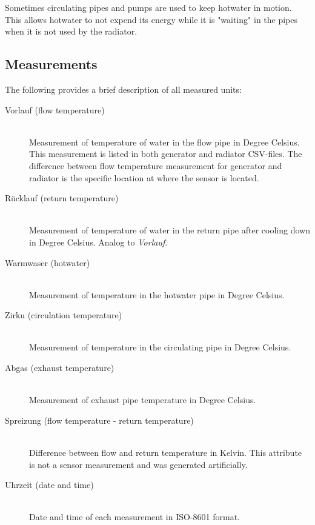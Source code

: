 \documentclass[bachelor,english]{info1thesis}
\begin{document}
Sometimes circulating pipes and pumps are used to keep hotwater in motion. This allows hotwater to not expend its energy while it is "waiting" in the pipes when it is not used by the radiator.

\subsection{Measurements}
\label{sec:measurements}

The following provides a brief description of all measured units:

\begin{description}
	\item[Vorlauf (flow temperature)]\hfill \\
	Measurement of temperature of water in the flow pipe in Degree Celsius. This measurement is listed in both generator and radiator CSV-files. The difference between flow temperature measurement for generator and radiator is the specific location at where the sensor is located.
	\item[Rücklauf (return temperature)]\hfill \\ 
	Measurement of temperature of water in the return pipe after cooling down in Degree Celsius. Analog to \textit{Vorlauf}.
	\item[Warmwaser (hotwater)]\hfill \\ 
	Measurement of temperature in the hotwater pipe in Degree Celsius.
	\item[Zirku (circulation temperature)]\hfill \\ 
	Measurement of temperature in the circulating pipe in Degree Celsius.
	
	\item[Abgas (exhaust temperature)]\hfill \\ 
	Measurement of exhaust pipe temperature in Degree Celsius.
	\item[Spreizung (flow temperature - return temperature)]\hfill \\ 
	Difference between flow and return temperature in Kelvin. This attribute is not a sensor measurement and was generated artificially.
	\item[Uhrzeit (date and time)]\hfill \\ 
	Date and time of each measurement in ISO-8601 format.
	
\end{description}
\end{document}
